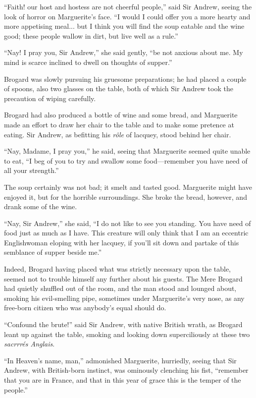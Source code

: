 \documentclass[paper=5.5in:8.5in,BCOR=7mm,twoside,DIV=calc,12pt,usegeometry,chapterprefix,endperiod,headings=big]{scrbook}
\begin{document}
\enquote{Faith! our host and hostess are not cheerful people,} said Sir Andrew, seeing the look of horror on Marguerite's face. \enquote{I would I could offer you a more hearty and more appetising meal... but I think you will find the soup eatable and the wine good; these people wallow in dirt, but live well as a rule.}

\enquote{Nay! I pray you, Sir Andrew,} she said gently, \enquote{be not anxious about me. My mind is scarce inclined to dwell on thoughts of supper.}

Brogard was slowly pursuing his gruesome preparations; he had placed a couple of spoons, also two glasses on the table, both of which Sir Andrew took the precaution of wiping carefully.

Brogard had also produced a bottle of wine and some bread, and Marguerite made an effort to draw her chair to the table and to make some pretence at eating. Sir Andrew, as befitting his \textit{rôle} of lacquey, stood behind her chair.

\enquote{Nay, Madame, I pray you,} he said, seeing that Marguerite seemed quite unable to eat, \enquote{I beg of you to try and swallow some food---remember you have need of all your strength.}

The soup certainly was not bad; it smelt and tasted good. Marguerite might have enjoyed it, but for the horrible surroundings. She broke the bread, however, and drank some of the wine.

\enquote{Nay, Sir Andrew,} she said, \enquote{I do not like to see you standing. You have need of food just as much as I have. This creature will only think that I am an eccentric Englishwoman eloping with her lacquey, if you'll sit down and partake of this semblance of supper beside me.}

Indeed, Brogard having placed what was strictly necessary upon the table, seemed not to trouble himself any further about his guests. The Mere Brogard had quietly shuffled out of the room, and the man stood and lounged about, smoking his evil-smelling pipe, sometimes under Marguerite's very nose, as any free-born citizen who was anybody's equal should do.

\enquote{Confound the brute!} said Sir Andrew, with native British wrath, as Brogard leant up against the table, smoking and looking down superciliously at these two \textit{sacrrrés Anglais}.

\enquote{In Heaven's name, man,} admonished Marguerite, hurriedly, seeing that Sir Andrew, with British-born instinct, was ominously clenching his fist, \enquote{remember that you are in France, and that in this year of grace this is the temper of the people.}
\end{document}
